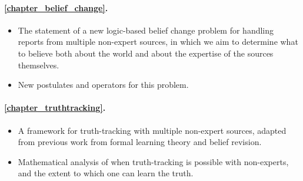 \paragraph{\cref{chapter_belief_change}.}
\begin{itemize}
    \item The statement of a new logic-based belief change problem for handling
          reports from multiple non-expert sources, in which we aim to
          determine what to believe both about the world and about the
          expertise of the sources themselves.
    \item New postulates and operators for this problem.
\end{itemize}

\paragraph{\cref{chapter_truthtracking}.}
\begin{itemize}
    \item A framework for truth-tracking with multiple non-expert sources,
          adapted from previous work from formal learning theory and belief
          revision.
    \item Mathematical analysis of when truth-tracking is possible with
          non-experts, and the extent to which one can learn the truth.
\end{itemize}
